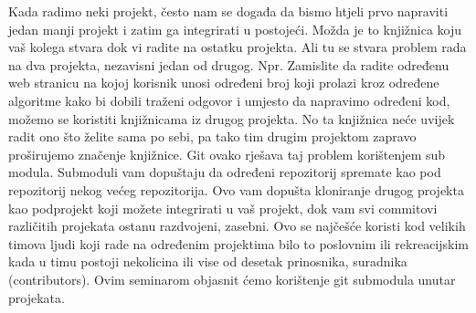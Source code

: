 \documentclass {article}
\begin{document}
Kada radimo neki projekt, često nam se događa da bismo htjeli prvo napraviti jedan manji projekt i zatim ga integrirati u postojeći. Možda je to knjižnica koju vaš kolega stvara dok vi radite na ostatku projekta. Ali tu se stvara problem rada na dva projekta, nezavisni jedan od drugog.
\newline
Npr. Zamislite da radite određenu web stranicu na kojoj korisnik unosi određeni broj koji prolazi kroz određene algoritme kako bi dobili traženi odgovor i umjesto da napravimo određeni kod, možemo se koristiti knjižnicama iz drugog projekta. No ta knjižnica neće uvijek radit ono što želite sama po sebi, pa tako tim drugim projektom zapravo proširujemo značenje knjižnice.
\newline
Git ovako rješava  taj problem korištenjem sub modula. Submoduli vam dopuštaju da određeni repozitorij spremate kao pod repozitorij nekog većeg repozitorija.
\newline
Ovo vam dopušta kloniranje drugog projekta kao podprojekt koji možete integrirati u vaš projekt, dok vam svi commitovi različitih projekata ostanu razdvojeni, zasebni.
\newline
Ovo se najčešće koristi kod velikih timova ljudi koji rade na određenim projektima bilo to poslovnim ili rekreacijskim kada u timu postoji nekolicina ili vise od desetak prinosnika, suradnika (contributors).
\newline
Ovim seminarom objasnit ćemo korištenje git submodula unutar projekata.

\newpage
\end{document}

